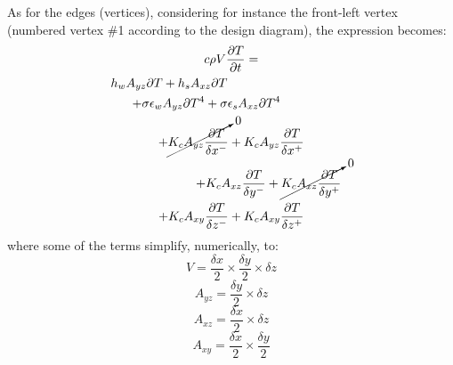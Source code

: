 \documentclass[a4paper,10pt]{IEEEtran}
\begin{document}
	As for the edges (vertices), considering for instance the front-left vertex (numbered vertex \#1 according to the design diagram), the expression becomes:
	\begin{multline}
	c \rho V \frac{\partial T}{\partial t} = \\
	h_w A_{yz}\partial T + h_s A_{xz}\partial T \qquad \qquad \qquad \qquad \qquad\\
	+ \sigma \epsilon_w A_{yz}\partial T^4 + \sigma \epsilon_s A_{xz}\partial T^4 \qquad \qquad\\
	+ \cancelto{0}{K_c A_{yz}\frac{\partial T}{\delta x^-}} + K_c A_{yz}\frac{\partial T}{\delta x^+} \\
	\qquad \qquad \qquad + K_c A_{xz}\frac{\partial T}{\delta y^-} + \cancelto{0}{K_c A_{xz}\frac{\partial T}{\delta y^+}}\\
	+ K_c A_{xy}\frac{\partial T}{\delta z^-} + K_c A_{xy}\frac{\partial T}{\delta z^+}
	\end{multline}
	where some of the terms simplify, numerically, to:
	$$V = \frac{\delta x}{2} \times \frac{\delta y}{2} \times \delta z $$
	$$A_{yz} = \frac{\delta y}{2} \times \delta z $$
	$$A_{xz} = \frac{\delta x}{2} \times \delta z $$
	$$A_{xy} = \frac{\delta x}{2} \times \frac{\delta y}{2} $$
	
\end{document}
